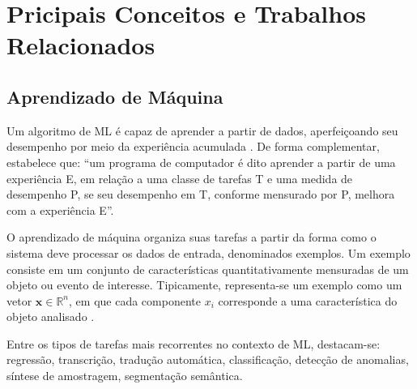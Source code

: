 \chapter{Pricipais Conceitos e Trabalhos Relacionados}\label{cap_2}

\section{Aprendizado de Máquina}

Um algoritmo de \ac{ML} é capaz de aprender a partir de dados, aperfeiçoando seu desempenho por meio da experiência acumulada \cite{goodfellow2016deep}. De forma complementar,  estabelece que: ``um programa de computador é dito aprender a partir de uma experiência E, em relação a uma classe de tarefas T e uma medida de desempenho P, se seu desempenho em T, conforme mensurado por P, melhora com a experiência E''.



O aprendizado de máquina organiza suas tarefas a partir da forma como o sistema deve processar os dados de entrada, denominados exemplos. Um exemplo consiste em um conjunto de características quantitativamente mensuradas de um objeto ou evento de interesse. Tipicamente, representa-se um exemplo como um vetor $\mathbf{x} \in \mathbb{R}^n$, em que cada componente $x_i$ corresponde a uma característica do objeto analisado \cite{goodfellow2016deep}.

Entre os tipos de tarefas mais recorrentes no contexto de \ac{ML}, destacam-se: regressão, transcrição, tradução automática, classificação, detecção de anomalias, síntese de amostragem, segmentação semântica. 






